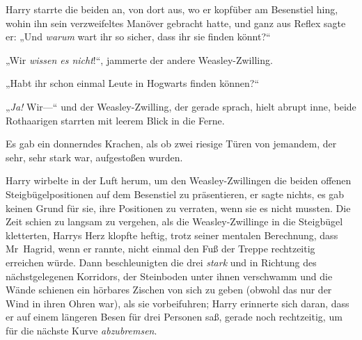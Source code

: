 Harry starrte die beiden an, von dort aus, wo er kopfüber am Besenstiel hing, wohin ihn sein verzweifeltes Manöver gebracht hatte, und ganz aus Reflex sagte er:
„Und \emph{warum} wart ihr so sicher, dass ihr sie finden könnt?“

„Wir \emph{wissen es nicht}!“, jammerte der andere Weasley-Zwilling.

„Habt ihr schon einmal Leute in Hogwarts finden können?“

„\emph{Ja!} Wir—“ und der Weasley-Zwilling, der gerade sprach, hielt abrupt inne, beide Rothaarigen starrten mit leerem Blick in die Ferne.

Es gab ein donnerndes Krachen, als ob zwei riesige Türen von jemandem, der sehr, sehr stark war, aufgestoßen wurden.

Harry wirbelte in der Luft herum, um den Weasley-Zwillingen die beiden offenen Steigbügelpositionen auf dem Besenstiel zu präsentieren, er sagte nichts, es gab keinen Grund für sie, ihre Positionen zu verraten, wenn sie es nicht mussten. Die Zeit schien zu langsam zu vergehen, als die Weasley-Zwillinge in die Steigbügel kletterten, Harrys Herz klopfte heftig, trotz seiner mentalen Berechnung, dass Mr~Hagrid, wenn er rannte, nicht einmal den Fuß der Treppe rechtzeitig erreichen würde. Dann beschleunigten die drei \emph{stark} und in Richtung des nächstgelegenen Korridors, der Steinboden unter ihnen verschwamm und die Wände schienen ein hörbares Zischen von sich zu geben (obwohl das nur der Wind in ihren Ohren war), als sie vorbeifuhren; Harry erinnerte sich daran, dass er auf einem längeren Besen für drei Personen saß, gerade noch rechtzeitig, um für die nächste Kurve \emph{abzubremsen}.

